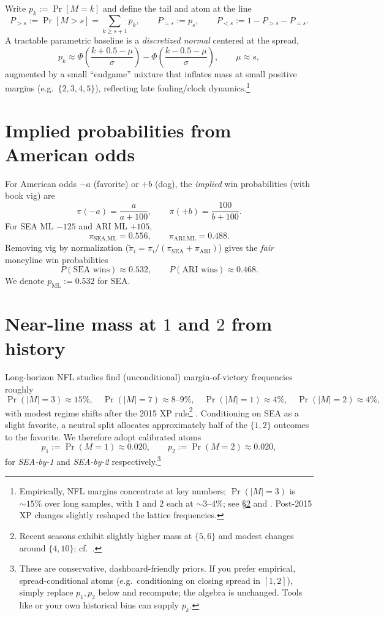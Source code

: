 \documentclass[11pt]{amsart}
\begin{document}
Write $p_k:=\Pr[M=k]$ and define the tail and atom at the line
\[
P_{>s}:=\Pr[M>s]=\sum_{k\ge s+1}p_k,\qquad P_{=s}:=p_s,\qquad P_{<s}:=1-P_{>s}-P_{=s}.
\]
A tractable parametric baseline is a \emph{discretized normal} centered at the spread,
\begin{equation}\label{eq:disc-normal}
p_k \approx \Phi\!\left(\frac{k+0.5-\mu}{\sigma}\right)-\Phi\!\left(\frac{k-0.5-\mu}{\sigma}\right),\qquad \mu\approx s,
\end{equation}
augmented by a small ``endgame'' mixture that inflates mass at small positive margins (e.g.\ $\{2,3,4,5\}$), reflecting late fouling/clock dynamics.\footnote{Empirically, NFL margins concentrate at key numbers; $\Pr(|M|=3)$ is $\sim 15\%$ over long samples, with $1$ and $2$ each at $\sim 3$--$4\%$; see \S\ref{sec:hist} and \cite{Boyds-KeyNumbers,Action-KeyNumbers-2024,Inpredictable-Distribution}. Post-2015 XP changes slightly reshaped the lattice frequencies.}

\section{Implied probabilities from American odds}
For American odds $-a$ (favorite) or $+b$ (dog), the \emph{implied} win probabilities (with book vig) are
\[
\pi(-a)=\frac{a}{a+100},\qquad \pi(+b)=\frac{100}{b+100}.
\]
For SEA ML $-125$ and ARI ML $+105$,
\[
\pi_{\text{SEA,ML}}=0.556,\qquad \pi_{\text{ARI,ML}}=0.488.
\]
Removing vig by normalization ($\widetilde\pi_i=\pi_i/(\pi_{\text{SEA}}+\pi_{\text{ARI}})$) gives the \emph{fair} moneyline win probabilities
\begin{equation}\label{eq:fair-ml}
P(\text{SEA wins})\approx 0.532,\qquad P(\text{ARI wins})\approx 0.468.
\end{equation}
We denote $p_{\mathrm{ML}}:=0.532$ for SEA.

\section{Near-line mass at $1$ and $2$ from history}\label{sec:hist}
Long-horizon NFL studies find (unconditional) margin-of-victory frequencies roughly
\[
\Pr(|M|=3)\approx 15\%,\quad \Pr(|M|=7)\approx 8\text{--}9\%,\quad \Pr(|M|=1)\approx 4\%,\quad \Pr(|M|=2)\approx 4\%,
\]
with modest regime shifts after the 2015 XP rule\footnote{Recent seasons exhibit slightly higher mass at $\{5,6\}$ and modest changes around $\{4,10\}$; cf.\ \cite{Action-KeyNumbers-2024}.} \cite{Boyds-KeyNumbers,Action-KeyNumbers-2024,CleanupHitter-CommonScores,Inpredictable-Distribution}.
Conditioning on SEA as a slight favorite, a neutral split allocates approximately half of the $\{1,2\}$ outcomes to the favorite. We therefore adopt calibrated atoms
\[
p_1:=\Pr(M=1)\approx 0.020,\qquad p_2:=\Pr(M=2)\approx 0.020,
\]
for \emph{SEA-by-1} and \emph{SEA-by-2} respectively.\footnote{These are conservative, dashboard-friendly priors. If you prefer empirical, spread-conditional atoms (e.g.\ conditioning on closing spread in $[1,2]$), simply replace $p_1,p_2$ below and recompute; the algebra is unchanged. Tools like \cite{Inpredictable-Distribution} or your own historical bins can supply $p_k$.}
\end{document}
